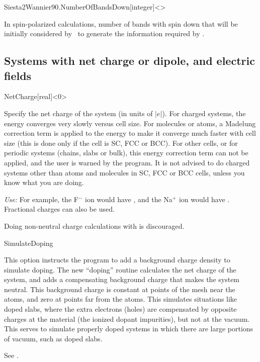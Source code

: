 \begin{fdfentry}{Siesta2Wannier90.NumberOfBandsDown}[integer]<>

  In spin-polarized calculations, number of bands with spin down that
  will be initially considered by \siesta\ to generate the information
  required by .

\end{fdfentry}



\subsection{Systems with net charge or dipole, and electric fields}

\begin{fdfentry}{NetCharge}[real]<$0$>%

  Specify the net charge of the system (in units of $|e|$).  For
  charged systems, the energy converges very slowly versus cell
  size. For molecules or atoms, a Madelung correction term is applied
  to the energy to make it converge much faster with cell size (this
  is done only if the cell is SC, FCC or BCC). For other cells, or for
  periodic systems (chains, slabs or bulk), this energy correction
  term can not be applied, and the user is warned by the program. It
  is not advised to do charged systems other than atoms and molecules
  in SC, FCC or BCC cells, unless you know what you are doing.

  \textit{Use:} For example, the F$^-$ ion would have 
   , and the Na$^+$ ion would have  .
  Fractional charges can also be used.

  \note Doing non-neutral charge calculations with
   is discouraged.
  
\end{fdfentry}


\begin{fdflogicalF}{SimulateDoping}

  This option instructs the program to add a background charge density
  to simulate doping.  The new ``doping'' routine calculates the net
  charge of the system, and adds a compensating background charge that
  makes the system neutral. This background charge is constant at
  points of the mesh near the atoms, and zero at points far from the
  atoms. This simulates situations like doped slabs, where the extra
  electrons (holes) are compensated by opposite charges at the material
  (the ionized dopant impurities), but not at the vacuum. This serves
  to simulate properly doped systems in which there are large portions
  of vacuum, such as doped slabs.

  See .

\end{fdflogicalF}

